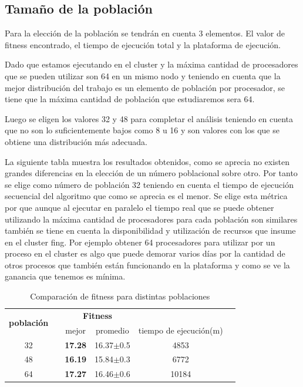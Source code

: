 \subsection{Tamaño de la población}

Para la elección de la población se tendrán en cuenta 3 elementos. El valor de fitness encontrado, el tiempo de ejecución total y la plataforma de ejecución.

Dado que estamos ejecutando en el cluster y la máxima cantidad de procesadores que se pueden utilizar son 64 en un mismo nodo y teniendo en cuenta que la mejor distribución del trabajo es un elemento de población por procesador, se tiene que la máxima cantidad de población que estudiaremos sera 64.

Luego se eligen los valores 32 y 48 para completar el análisis teniendo en cuenta que no son lo suficientemente bajos como 8 u 16 y son valores con los que se obtiene una distribución más adecuada.

La siguiente tabla muestra los resultados obtenidos, como se aprecia no existen grandes diferencias en la elección de un número poblacional sobre otro. Por tanto se elige como número de población 32 teniendo en cuenta el tiempo de ejecución secuencial del algoritmo que como se aprecia es el menor. Se elige esta métrica por que aunque al ejecutar en paralelo el tiempo real que se puede obtener utilizando la máxima cantidad de procesadores para cada población son similares también se tiene en cuenta la disponibilidad y utilización de recursos que insume en el cluster fing. Por ejemplo obtener 64 procesadores para utilizar por un proceso en el cluster es algo que puede demorar varios días por la cantidad de otros procesos que también están funcionando en la plataforma y como se ve la ganancia que tenemos es mínima.

\begin{table}[h]
	\renewcommand{\arraystretch}{1.2}
	\caption{Comparación de fitness para distintas poblaciones}
	\label{table:parametro_poblacion}
	\centering
	\begin{tabular}{ccrrcr}
		\hline
		\multirow{2}{*}{\textbf{población}} & & 
		\multicolumn{2}{c}{\textbf{Fitness}} \\
		\cline{3-4}
		& & \multicolumn{1}{c}{mejor} 
		& \multicolumn{1}{c}{promedio} 
		& \multicolumn{1}{c}{tiempo de ejecución(m)} \\
		\hline
		32 & & \textbf{17.28} & 16.37$\pm$0.5 & 4853\\
		48 & & \textbf{16.19} & 15.84$\pm$0.3 & 6772\\
		64 & & \textbf{17.27} & 16.46$\pm$0.6 & 10184\\
		\hline
	\end{tabular}
\end{table}





